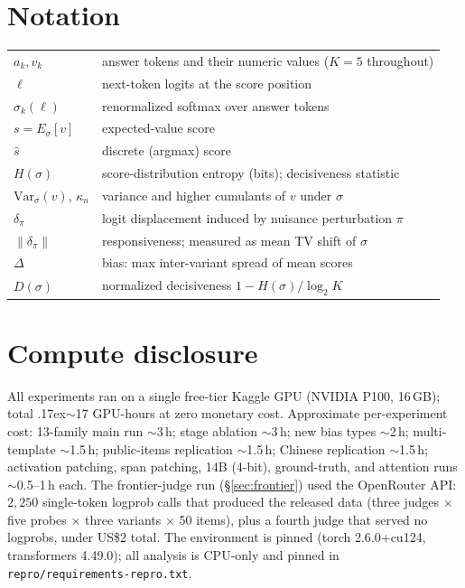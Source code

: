\documentclass[11pt]{article}
\begin{document}
\section{Notation}\label{app:notation}
\begin{table}[h]\centering\small
\begin{tabular}{ll}
\toprule
$a_k, v_k$ & answer tokens and their numeric values ($K=5$ throughout) \\
$\ell$ & next-token logits at the score position \\
$\sigma_k(\ell)$ & renormalized softmax over answer tokens \\
$s = E_\sigma[v]$ & expected-value score \\
$\hat s$ & discrete (argmax) score \\
$H(\sigma)$ & score-distribution entropy (bits); decisiveness statistic \\
$\mathrm{Var}_\sigma(v)$, $\kappa_n$ & variance and higher cumulants of $v$ under $\sigma$ \\
$\delta_\pi$ & logit displacement induced by nuisance perturbation $\pi$ \\
$\|\delta_\pi\|$ & responsiveness; measured as mean TV shift of $\sigma$ \\
$\Delta$ & bias: max inter-variant spread of mean scores \citep{li2025scoring} \\
$D(\sigma)$ & normalized decisiveness $1-H(\sigma)/\log_2 K$ \\
\bottomrule
\end{tabular}
\end{table}

\section{Compute disclosure}\label{app:compute}
All experiments ran on a single free-tier Kaggle GPU (NVIDIA P100, 16\,GB); total
{\raise.17ex\hbox{$\scriptstyle\sim$}}17 GPU-hours at zero monetary cost. Approximate
per-experiment cost: 13-family main run $\sim$3\,h; stage ablation $\sim$3\,h; new
bias types $\sim$2\,h; multi-template $\sim$1.5\,h; public-items replication
$\sim$1.5\,h; Chinese replication $\sim$1.5\,h; activation patching, span patching,
14B (4-bit), ground-truth, and attention runs $\sim$0.5--1\,h each. The
frontier-judge run (\S\ref{sec:frontier}) used the OpenRouter API: $2{,}250$
single-token logprob calls that produced the released data (three judges $\times$
five probes $\times$ three variants $\times$ 50 items), plus a fourth judge that
served no logprobs, under US\$2 total. The environment is
pinned (torch 2.6.0+cu124, transformers 4.49.0); all analysis is CPU-only and pinned
in \texttt{repro/requirements-repro.txt}.
\end{document}
